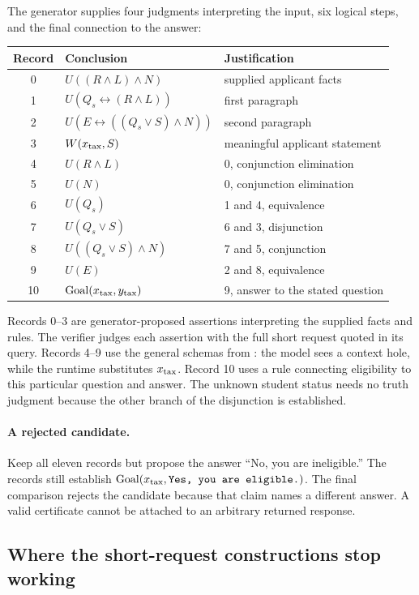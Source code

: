 \documentclass[11pt,twoside]{article}
\theoremstyle{definition}
\newcommand{\Goal}{\operatorname{Goal}}
\begin{document}
The generator supplies four judgments interpreting the input, six logical
steps, and the final connection to the answer:
\begin{center}
\begin{tabular}{cll}
\toprule
Record & Conclusion & Justification\\
\midrule
0 & $U((R\wedge L)\wedge N)$ & supplied applicant facts\\
1 & $U(Q_s\leftrightarrow(R\wedge L))$ & first paragraph\\
2 & $U(E\leftrightarrow((Q_s\vee S)\wedge N))$ & second paragraph\\
3 & $W(x_{\rm tax},S)$ & meaningful applicant statement\\
4 & $U(R\wedge L)$ & 0, conjunction elimination\\
5 & $U(N)$ & 0, conjunction elimination\\
6 & $U(Q_s)$ & 1 and 4, equivalence\\
7 & $U(Q_s\vee S)$ & 6 and 3, disjunction\\
8 & $U((Q_s\vee S)\wedge N)$ & 7 and 5, conjunction\\
9 & $U(E)$ & 2 and 8, equivalence\\
10 & $\Goal(x_{\rm tax},y_{\rm tax})$ & 9, answer to the stated question\\
\bottomrule
\end{tabular}
\end{center}
Records 0--3 are generator-proposed assertions interpreting the supplied
facts and rules. The verifier judges each assertion with the full short
request quoted in its query. Records 4--9 use the general schemas from
: the model sees a context hole, while the
runtime substitutes $x_{\rm tax}$. Record 10 uses a rule connecting eligibility
to this particular question and answer. The unknown student status needs
no truth judgment because the other branch of the disjunction is established.

\paragraph{A rejected candidate.}
Keep all eleven records but propose the answer ``No, you are ineligible.''
The records still establish $\Goal(x_{\rm tax},\texttt{Yes, you are eligible.})$.
The final comparison rejects the candidate because that claim names a
different answer. A valid certificate cannot be attached to an arbitrary
returned response.

\subsection{Where the short-request constructions stop working}
\label{sec:short-input-limit}
\end{document}
